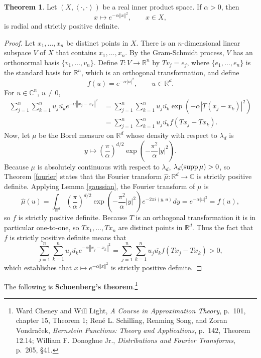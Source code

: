 \documentclass{article}
\newcommand{\inner}[2]{\left\langle #1, #2 \right\rangle}
\newcommand{\supp}{\ensuremath\mathrm{supp}\,}
\newcommand{\norm}[1]{\left\Vert #1 \right\Vert}
\theoremstyle{definition}
\newtheorem{theorem}{Theorem}
\theoremstyle{definition}
\begin{document}
\begin{theorem}
Let $(X,\inner{\cdot}{\cdot})$ be a real inner product space. If $\alpha>0$, then
\[
x \mapsto  e^{-\alpha  \norm{x}^2},\qquad x \in X,
\]
is radial and strictly positive definite.
\label{ealpha}
\end{theorem}
\begin{proof}
Let $x_1,\ldots,x_n$ be distinct points in $X$. There is an $n$-dimensional linear subspace
$V$ of $X$ that contains $x_1,\ldots,x_n$. By the Gram-Schmidt process, $V$ has an orthonormal basis
$\{v_1,\ldots,v_n\}$. Define $T:V \to \mathbb{R}^n$ by $Tv_j=e_j$, where $\{e_1,\ldots,e_n\}$ is the standard
basis for $\mathbb{R}^n$, which is an orthogonal transformation, and define
\[
f(u) = e^{-\alpha |u|^2}, \qquad  u \in \mathbb{R}^d.
\]
For $u \in \mathbb{C}^n$, $u \neq 0$,
\begin{align*}
\sum_{j=1}^n \sum_{k=1}^n u_j \overline{u_k} e^{-\alpha \norm{x_j-x_k}^2}
&=\sum_{j=1}^n \sum_{k=1}^n u_j \overline{u_k} \exp\left(-\alpha |T(x_j-x_k)|^2 \right)\\
&=\sum_{j=1}^n \sum_{k=1}^n u_j \overline{u_k} f(Tx_j-Tx_k).
\end{align*}
Now, let $\mu$ be the Borel measure on $\mathbb{R}^d$ whose density with respect to $\lambda_d$ is
\[
y \mapsto \left( \frac{\pi}{\alpha} \right)^{d/2} \exp\left(-\frac{\pi^2}{\alpha} |y|^2 \right).
\]
Because $\mu$ is absolutely continuous with respect to $\lambda_d$, 
$\lambda_d(\supp \mu)>0$, so Theorem \ref{fourier} states that the Fourier transform
$\hat{\mu}:\mathbb{R}^d \to \mathbb{C}$ is strictly positive definite. 
Applying Lemma \ref{gaussian},
the Fourier transform of $\mu$ is
\[
\hat{\mu}(u) = \int_{\mathbb{R}^d} \left( \frac{\pi}{\alpha} \right)^{d/2} \exp\left(-\frac{\pi^2}{\alpha} |y|^2 \right) 
e^{-2\pi  i\inner{y}{u}} dy
=e^{-\alpha |u|^2}=f(u),
\]
so $f$ is strictly positive definite. Because $T$ is an orthogonal transformation it is in particular one-to-one, so
$Tx_1,\ldots,Tx_n$ are distinct points in $\mathbb{R}^d$. Thus the fact that $f$ is strictly positive definite means that
\[
\sum_{j=1}^n \sum_{k=1}^n u_j \overline{u_k} e^{-\alpha \norm{x_j-x_k}^2} = \sum_{j=1}^n \sum_{k=1}^n u_j \overline{u_k} f(Tx_j-Tx_k)
>0,
\]
which establishes that $x \mapsto e^{-\alpha \norm{x}^2}$ is strictly positive definite. 
\end{proof}


The following is \textbf{Schoenberg's theorem}.\footnote{Ward Cheney and Will Light, {\em A Course
in Approximation Theory}, p.~101, chapter 15, Theorem 1;
Ren\'e L. Schilling, Renming Song, and Zoran Vondra\v{c}ek, {\em Bernstein Functions: Theory and Applications}, p.~142, Theorem 12.14;
William F. Donoghue Jr., {\em Distributions and Fourier Transforms}, p.~205, \S 41.}
\end{document}

